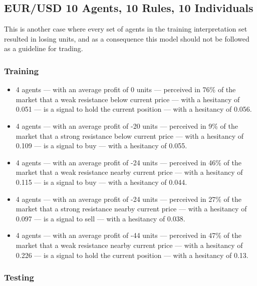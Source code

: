 \subsection{EUR/USD 10 Agents, 10 Rules, 10 Individuals}
\label{results:interpretation-eur-usd-10agents-10rules-10individuals}

This is another case where every set of agents in the training interpretation set resulted in losing units, and as a consequence this model should not be followed as a guideline for trading.

\subsubsection{Training}

{\small
  \begin{itemize}
  \item 4 agents — with an average profit of 0 units — perceived in 76\% of the
    market that a weak resistance below current price — with a hesitancy of
    0.051 — is a signal to hold the current position — with a hesitancy of
    0.056.
  \item 4 agents — with an average profit of -20 units — perceived in 9\% of the
    market that a strong resistance below current price — with a hesitancy of
    0.109 — is a signal to buy — with a hesitancy of 0.055.
  \item 4 agents — with an average profit of -24 units — perceived in 46\% of
    the market that a weak resistance nearby current price — with a hesitancy of
    0.115 — is a signal to buy — with a hesitancy of 0.044.
  \item 4 agents — with an average profit of -24 units — perceived in 27\% of
    the market that a strong resistance nearby current price — with a hesitancy
    of 0.097 — is a signal to sell — with a hesitancy of 0.038.
  \item 4 agents — with an average profit of -44 units — perceived in 47\% of
    the market that a weak resistance nearby current price — with a hesitancy of
    0.226 — is a signal to hold the current position — with a hesitancy of 0.13.
  \end{itemize}
}

\subsubsection{Testing}

